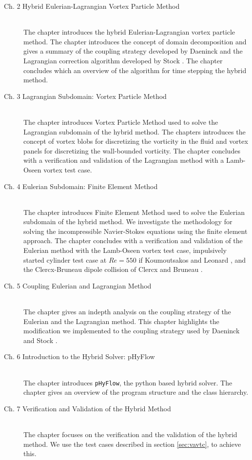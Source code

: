 \begin{description}
\item[Ch. 2 \qquad Hybrid Eulerian-Lagrangian Vortex Particle Method]\hfill\\
The chapter introduces the hybrid Eulerian-Lagrangian vortex particle method. The chapter introduces the concept of domain decomposition and gives a summary of the coupling strategy developed by Daeninck \cite{Daeninck2006} and the Lagrangian correction algorithm developed by Stock \cite{Stock2010a}. The chapter concludes which an overview of the algorithm for time stepping the hybrid method.

\item[Ch. 3 \qquad Lagrangian Subdomain: Vortex Particle Method]\hfill\\
The chapter introduces Vortex Particle Method used to solve the Lagrangian subdomain of the hybrid method. The chapters introduces the concept of vortex blobs for discretizing the vorticity in the fluid and vortex panels for discretizing the wall-bounded vorticity. The chapter concludes with a verification and validation of the Lagrangian method with a Lamb-Oseen vortex test case.

\item[Ch. 4 \qquad Eulerian Subdomain: Finite Element Method]\hfill\\
The chapter introduces Finite Element Method used to solve the Eulerian subdomain of the hybrid method. We investigate the methodology for solving the incompressible Navier-Stokes equations using the finite element approach. The chapter concludes with a verification and validation of the Eulerian method with the Lamb-Oseen vortex test case, impulsively started cylinder test case at $Re=550$ if Koumoutsakos and Leonard \cite{Koumoutsakos1995a}, and the Clercx-Bruneau dipole collision of Clercx and Bruneau \cite{Clercx2006a}.

\item[Ch. 5 \qquad Coupling Eulerian and Lagrangian Method]\hfill\\
The chapter gives an indepth analysis on the coupling strategy of the Eulerian and the Lagrangian method. This chapter highlights the modification we implemented to the coupling strategy used by Daeninck \cite{Daeninck2006} and Stock \cite{Stock2010a}.

\item[Ch. 6 \qquad Introduction to the Hybrid Solver: pHyFlow]\hfill\\
The chapter introduces \texttt{pHyFlow}, the python based hybrid solver. The chapter gives an overview of the program structure and the class hierarchy.

\item[Ch. 7 \qquad Verification and Validation of the Hybrid Method]\hfill\\
The chapter focuses on the verification and the validation of the hybrid method. We use the test cases described in section \ref{sec:vavtc}, to achieve this.

\end{description}

